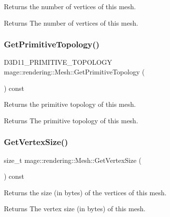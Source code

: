 Returns the number of vertices of this mesh.

\begin{DoxyReturn}{Returns}
The number of vertices of this mesh. 
\end{DoxyReturn}
\mbox{\label{classmage_1_1rendering_1_1_mesh_af6cead725f7e5352a90a8f8847580f75}} 
\subsubsection{\texorpdfstring{Get\+Primitive\+Topology()}{GetPrimitiveTopology()}}
{\footnotesize\ttfamily D3\+D11\+\_\+\+P\+R\+I\+M\+I\+T\+I\+V\+E\+\_\+\+T\+O\+P\+O\+L\+O\+GY mage\+::rendering\+::\+Mesh\+::\+Get\+Primitive\+Topology (\begin{DoxyParamCaption}{ }\end{DoxyParamCaption}) const\hspace{0.3cm}{\ttfamily [noexcept]}}

Returns the primitive topology of this mesh.

\begin{DoxyReturn}{Returns}
The primitive topology of this mesh. 
\end{DoxyReturn}
\mbox{\label{classmage_1_1rendering_1_1_mesh_a0fcc1a72aa5426ce9b020b580eb22a43}} 
\subsubsection{\texorpdfstring{Get\+Vertex\+Size()}{GetVertexSize()}}
{\footnotesize\ttfamily size\+\_\+t mage\+::rendering\+::\+Mesh\+::\+Get\+Vertex\+Size (\begin{DoxyParamCaption}{ }\end{DoxyParamCaption}) const\hspace{0.3cm}{\ttfamily [noexcept]}}

Returns the size (in bytes) of the vertices of this mesh.

\begin{DoxyReturn}{Returns}
The vertex size (in bytes) of this mesh. 
\end{DoxyReturn}
\mbox{\label{classmage_1_1rendering_1_1_mesh_a17f6dd40e8eea41b469b475de93ee466}} 
